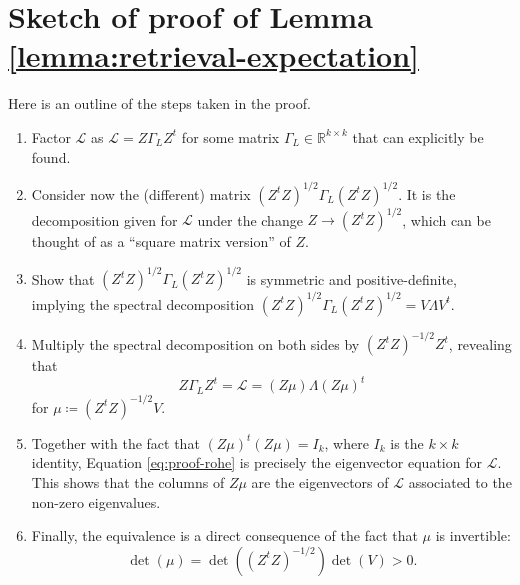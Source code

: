 \documentclass[../../main.tex]{subfiles} %
\begin{document}
\section{Sketch of proof of Lemma \ref{lemma:retrieval-expectation}}
\label{appendix:sketch-lemma-retrieval}
Here is an outline of the steps taken in the proof.
\begin{enumerate}
	\item Factor \(\mathscr L\) as \(\mathscr L = Z \Gamma_L Z^t\) for 
	some matrix \(\Gamma_L \in \mathbb R^{k \times k}\) that can explicitly be 
	found.
	\item Consider now the (different) matrix \((Z^t Z)^{1/2} \Gamma_L 
	(Z^t Z)^{1/2}\). It is the decomposition given for \(\mathscr L\) under 
	the change \(Z \to (Z^t Z)^{1/2}\), which can be thought of as a ``square 
	matrix version'' of \(Z\).
	\item Show that \((Z^t Z)^{1/2} \Gamma_L (Z^t Z)^{1/2}\) is symmetric and 
	positive-definite, implying the spectral decomposition 
	\((Z^t Z)^{1/2} \Gamma_L (Z^t Z)^{1/2} = V \Lambda V^t\).
	\item Multiply the spectral decomposition on both sides by \((Z^t Z)^{-1/2} 
	Z^t\), revealing that
	\begin{equation} \label{eq:proof-rohe}
		Z \Gamma_L Z^t = \mathscr L = (Z \mu) \Lambda (Z \mu)^t
	\end{equation}
	for \(\mu \coloneqq (Z^t Z)^{-1/2} V\).
	\item Together with the fact that \((Z \mu)^t (Z \mu) = I_k\), where \(I_k\) is 
	the \(k \times k\) identity, Equation \ref{eq:proof-rohe} is precisely the 
	eigenvector equation for \(\mathscr L\). This shows that the columns of \(Z 
	\mu\) are the eigenvectors of \(\mathscr L\) associated to the non-zero 
	eigenvalues.
	\item Finally, the equivalence is a direct consequence of the fact 
	that \(\mu\) is invertible:
	\begin{equation*}
		\det(\mu) = \det((Z^t Z)^{-1/2}) \det(V) > 0.
	\end{equation*} 
\end{enumerate}
\end{document}

